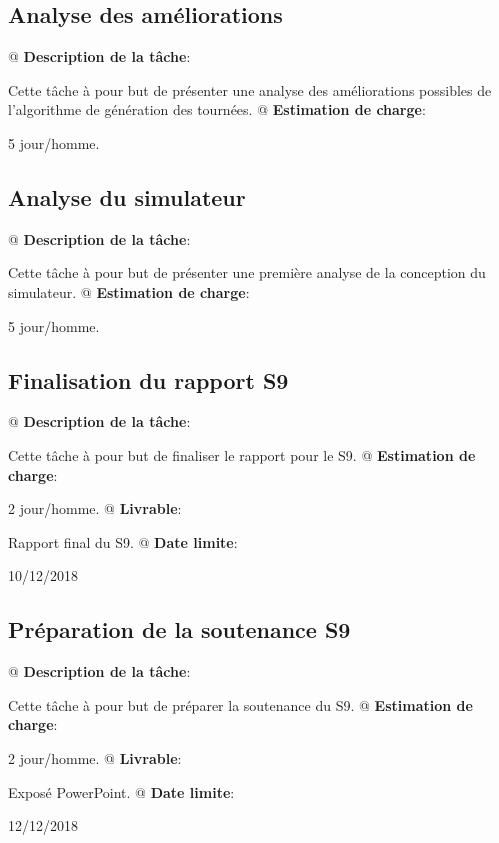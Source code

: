 \documentclass[final]{polytech/polytech}
\begin{document}
		\subsection{Analyse des améliorations}
			\begin{easylist}
				@ \textbf{Description de la tâche}:
				
				Cette tâche à pour but de présenter une analyse des améliorations possibles de l'algorithme de génération des tournées.
				@ \textbf{Estimation de charge}:
				
				5 jour/homme.
			\end{easylist}
			
		\subsection{Analyse du simulateur}
			\begin{easylist}
				@ \textbf{Description de la tâche}:
				
				Cette tâche à pour but de présenter une première analyse de la conception du simulateur.
				@ \textbf{Estimation de charge}:
				
				5 jour/homme.
			\end{easylist}
			
		\subsection{Finalisation du rapport S9}
			\begin{easylist}
				@ \textbf{Description de la tâche}:
				
				Cette tâche à pour but de finaliser le rapport pour le S9.
				@ \textbf{Estimation de charge}:
				
				2 jour/homme.
				@ \textbf{Livrable}:
				
				Rapport final du S9.
				@ \textbf{Date limite}:
				
				10/12/2018
			\end{easylist}
			
		\subsection{Préparation de la soutenance S9}
			\begin{easylist}
				@ \textbf{Description de la tâche}:
				
				Cette tâche à pour but de préparer la soutenance du S9.
				@ \textbf{Estimation de charge}:
				
				2 jour/homme.
				@ \textbf{Livrable}:
				
				Exposé PowerPoint.
				@ \textbf{Date limite}:
				
				12/12/2018
			\end{easylist}
			
\end{document}
